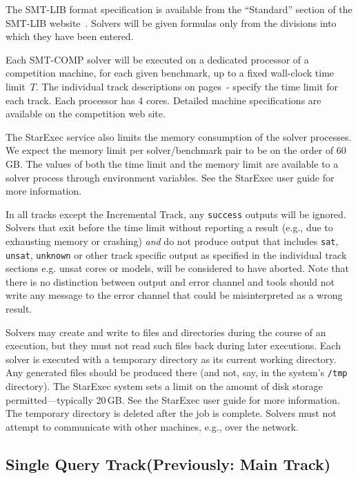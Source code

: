 \documentclass[12pt]{article}
\newcommand{\maintrack}{Single Query Track\xspace}
\newcommand{\inctrack}{Incremental Track\xspace}
\begin{document}
%
The SMT-LIB format specification is available from the ``Standard''
section of the SMT-LIB website~\cite{SMT-LIB}.  Solvers will be given
formulas only from the divisions into which they have been entered.

%
Each SMT-COMP solver will be executed on a dedicated processor of a
competition machine, for each given benchmark, up to a fixed
wall-clock time limit~$T$. The individual track descriptions on
pages~\pageref{sec:exec:single}-\pageref{sec:exec:model} specify
the time limit for each track. Each processor has 4 cores.  Detailed
machine specifications are available on the competition web site.

The StarExec service also limits the memory consumption of the solver
processes.  We expect the memory limit per solver/benchmark pair to be
on the order of 60\,GB.  The values of both the time limit and the
memory limit are available to a solver process through environment
variables.  See the StarExec user guide for more information.

%
In all tracks except the \inctrack, any \texttt{success} outputs will be
ignored.  Solvers that exit before the time limit without reporting a result
(e.g., due to exhausting memory or crashing) \emph{and} do not produce output
that includes \texttt{sat}, \texttt{unsat}, \texttt{unknown} or other track
specific output as specified in the individual track sections e.g. unsat cores
or models, will be considered to have aborted.  Note that there is no
distinction between output and error channel and tools should not write any
message to the error channel that could be misinterpreted as a wrong result.

%
Solvers may create and write to files and directories during the
course of an execution, but they must not read such files back during
later executions.  Each solver is executed with a temporary directory
as its current working directory.  Any generated files should be
produced there (and not, say, in the system's \texttt{/tmp}
directory).  The StarExec system sets a limit on the amount of disk
storage permitted---typically 20\,GB.  See the StarExec user guide for
more information.  The temporary directory is deleted after the job is
complete.  Solvers must not attempt to communicate with other
machines, e.g., over the network.


\subsection{\maintrack (Previously: Main Track)}
\label{sec:exec:single}
\end{document}
